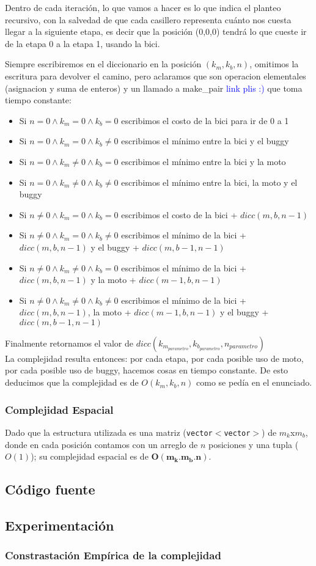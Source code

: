 Dentro de cada iteraci\'on, lo que vamos a hacer es lo que indica el planteo recursivo, con la salvedad de que cada casillero representa cu\'anto nos cuesta llegar a la siguiente etapa, es decir que la posici\'on (0,0,0) tendr\'a lo que cueste ir de la etapa 0 a la etapa 1, usando la bici.

Siempre escribiremos en el diccionario en la posici\'on $(k{_m}, k{_b}, n)$, omitimos la escritura para devolver el camino, pero aclaramos que son operacion elementales (asignacion y suma de enteros) y un llamado a make_pair \textcolor{blue}{link plis :)} que toma tiempo constante:

\begin{itemize}
\item Si $n=0 \wedge k_m=0 \wedge k_b=0$ escribimos el costo de la bici para ir de 0 a 1
\item Si $n=0 \wedge k_m=0 \wedge k_b\neq0$ escribimos el m\'inimo entre la bici y el buggy
\item Si $n=0 \wedge k_m\neq0 \wedge k_b=0$ escribimos el m\'inimo entre la bici y la moto
\item Si $n=0 \wedge k_m\neq0 \wedge k_b\neq0$ escribimos el m\'inimo entre la bici, la moto y el buggy
\item Si $n\neq0 \wedge k_m=0 \wedge k_b=0$ escribimos el costo de la bici + $dicc(m, b, n-1)$
\item Si $n\neq0 \wedge k_m=0 \wedge k_b\neq0$ escribimos el m\'inimo de la bici + $dicc(m, b, n-1)$ y el buggy + $dicc(m, b-1, n-1)$
\item Si $n\neq0 \wedge k_m\neq0 \wedge k_b=0$ escribimos el m\'inimo de la bici + $dicc(m, b, n-1)$ y la moto + $dicc(m-1, b, n-1)$
\item Si $n\neq0 \wedge k_m\neq0 \wedge k_b\neq0$ escribimos el m\'inimo de la bici + $dicc(m, b, n-1)$, la moto + $dicc(m-1, b, n-1)$ y el buggy + $dicc(m, b-1, n-1)$
\end{itemize}

Finalmente retornamos el valor de $dicc(k_{m_{parametro}},k_{b_{parametro}},n_{parametro})$\\

La complejidad resulta entonces: por cada etapa, por cada posible uso de moto, por cada posible uso de buggy, hacemos cosas en tiempo constante. De esto deducimos que la complejidad es de $O(k_{m},k_{b},n)$ como se ped\'ia en el enunciado.

\subsubsection{Complejidad Espacial}
Dado que la estructura utilizada es una matriz (\texttt{vector$<$vector$>$}) de $m_k$x$m_b$, donde en cada posici\'on contamos con un arreglo de $n$ posiciones y una tupla ($O(1)$); su complejidad espacial es de $\mathbf{O(m_k.m_b.n)}$.

\newpage
\subsection{C\'odigo fuente}
\subsection{Experimentaci\'on}

\subsubsection{Constrastaci\'on Emp\'irica de la complejidad}
